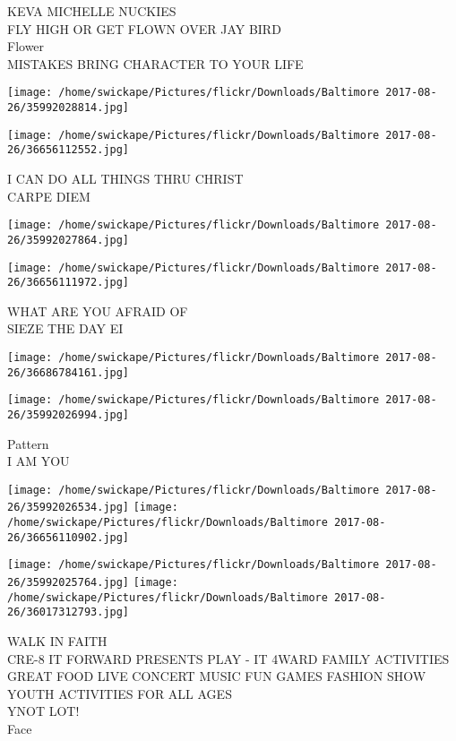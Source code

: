 \documentclass[10pt,letterpaper]{article}
\begin{document}
KEVA MICHELLE NUCKIES\\
FLY HIGH OR GET FLOWN OVER JAY BIRD\\
Flower\\
MISTAKES BRING CHARACTER TO YOUR LIFE
\pagebreak

\texttt{[image: /home/swickape/Pictures/flickr/Downloads/Baltimore 2017-08-26/35992028814.jpg]}

\vspace{0.25in}
\texttt{[image: /home/swickape/Pictures/flickr/Downloads/Baltimore 2017-08-26/36656112552.jpg]}

I CAN DO ALL THINGS THRU CHRIST\\
CARPE DIEM
\pagebreak

\texttt{[image: /home/swickape/Pictures/flickr/Downloads/Baltimore 2017-08-26/35992027864.jpg]}

\vspace{0.25in}
\texttt{[image: /home/swickape/Pictures/flickr/Downloads/Baltimore 2017-08-26/36656111972.jpg]}

WHAT ARE YOU AFRAID OF\\
SIEZE THE DAY EI
\pagebreak

\texttt{[image: /home/swickape/Pictures/flickr/Downloads/Baltimore 2017-08-26/36686784161.jpg]}

\vspace{0.25in}
\texttt{[image: /home/swickape/Pictures/flickr/Downloads/Baltimore 2017-08-26/35992026994.jpg]}

Pattern\\
I AM YOU
\pagebreak

\texttt{[image: /home/swickape/Pictures/flickr/Downloads/Baltimore 2017-08-26/35992026534.jpg]}
\texttt{[image: /home/swickape/Pictures/flickr/Downloads/Baltimore 2017-08-26/36656110902.jpg]}

\texttt{[image: /home/swickape/Pictures/flickr/Downloads/Baltimore 2017-08-26/35992025764.jpg]}
\texttt{[image: /home/swickape/Pictures/flickr/Downloads/Baltimore 2017-08-26/36017312793.jpg]}

WALK IN FAITH\\
CRE{-}8 IT FORWARD PRESENTS PLAY {-} IT 4WARD FAMILY ACTIVITIES GREAT FOOD LIVE CONCERT MUSIC FUN GAMES FASHION SHOW YOUTH ACTIVITIES FOR ALL AGES\\
YNOT LOT!\\
Face
\pagebreak
\end{document}
